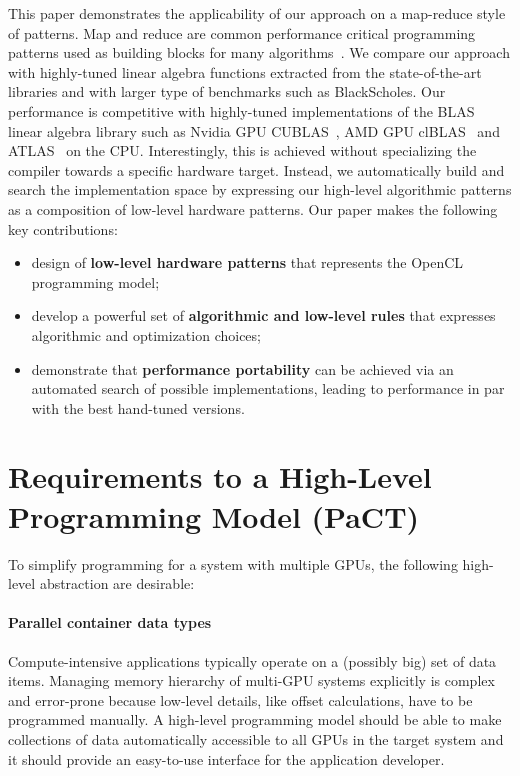 This paper demonstrates the applicability of our approach on a map-reduce style of patterns.
Map and reduce are common performance critical programming patterns used as building blocks for many algorithms~\cite{AsanovicBoCaGeHuKePaPlShWiYe2006}.
We compare our approach with highly-tuned linear algebra functions extracted from the state-of-the-art libraries and with larger type of benchmarks such as BlackScholes.
Our performance is competitive with highly-tuned implementations of the BLAS linear algebra library such as Nvidia GPU CUBLAS~\cite{cuBLAS}, AMD GPU clBLAS~\cite{clBLAS} and ATLAS~\cite{WhaleyD98} on the CPU.
Interestingly, this is achieved without specializing the compiler towards a specific hardware target.
Instead, we automatically build and search the implementation space by expressing our high-level algorithmic patterns as a composition of low-level hardware patterns.
Our paper makes the following key contributions:
\vspace{0.2em}
\begin{itemize}
  \item design of \textbf{low-level hardware patterns} that represents the OpenCL programming model; \vspace{0pt}
  \item develop a powerful set of \textbf{algorithmic and low-level rules} that expresses algorithmic and optimization choices; \vspace{0pt}
  \item demonstrate that \textbf{performance portability} can be achieved via an automated search of possible implementations, leading to performance in par with the best hand-tuned versions. \vspace{0pt}
\end{itemize}




\section{Requirements to a High-Level Programming Model (PaCT)}
To simplify programming for a system with multiple GPUs, the following high-level abstraction are desirable:

\paragraph{Parallel container data types}
Compute-intensive applications typically operate on a (possibly big) set of data items.
Managing memory hierarchy of multi-GPU systems explicitly is complex and error-prone because low-level details, like offset calculations, have to be programmed manually.
A high-level programming model should be able to make collections of data automatically accessible to all GPUs in the target system and it should provide an easy-to-use interface for the application developer.


